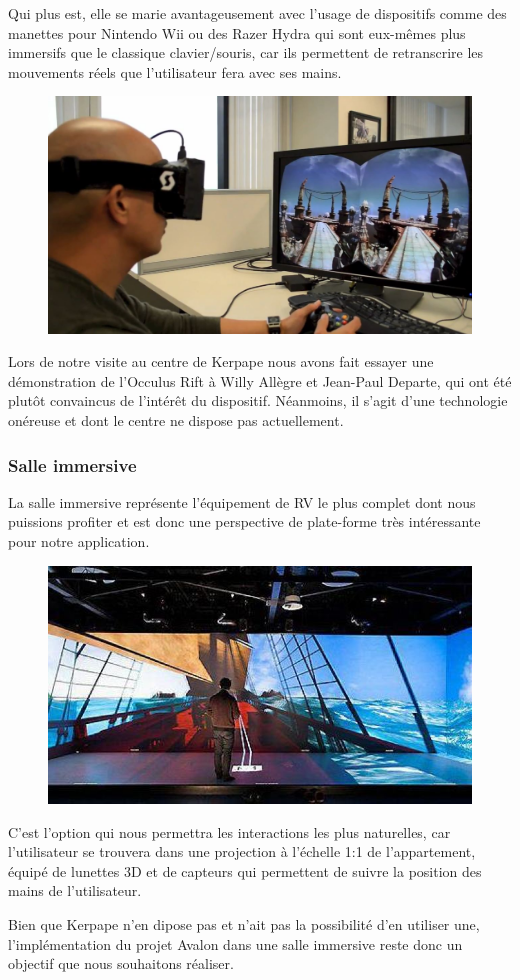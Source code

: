 Qui plus est, elle se marie avantageusement avec l'usage de dispositifs comme des manettes pour Nintendo Wii ou des Razer Hydra qui sont eux-mêmes plus immersifs que le classique clavier/souris, car ils permettent de retranscrire les mouvements réels que l'utilisateur fera avec ses mains. \newline
\begin{figure}
  \centering
  \includegraphics[scale=0.3]{2-Specifications/img-utilisateur/occulus.jpg}
\end{figure}
Lors de notre visite au centre de Kerpape nous avons fait essayer une démonstration de l'Occulus Rift à Willy Allègre et Jean-Paul Departe, qui ont été plutôt convaincus de l'intérêt du dispositif. Néanmoins, il s'agit d'une technologie onéreuse et dont le centre ne dispose pas actuellement.

\subsubsection{Salle immersive}
La salle immersive représente l'équipement de RV le plus complet dont nous puissions profiter et est donc une perspective de plate-forme très intéressante pour notre application.
\begin{figure}
	\centering
	\includegraphics[scale=0.5]{2-Specifications/img-utilisateur/immersia.jpg}
\end{figure}
C'est l'option qui nous permettra les interactions les plus naturelles, car l'utilisateur se trouvera dans une projection à l'échelle 1:1 de l'appartement, équipé de lunettes 3D et de capteurs qui permettent de suivre la position des mains de l'utilisateur. \newline

Bien que Kerpape n'en dipose pas et n'ait pas la possibilité d'en utiliser une, l'implémentation du projet Avalon dans une salle immersive reste donc un objectif que nous souhaitons réaliser.
